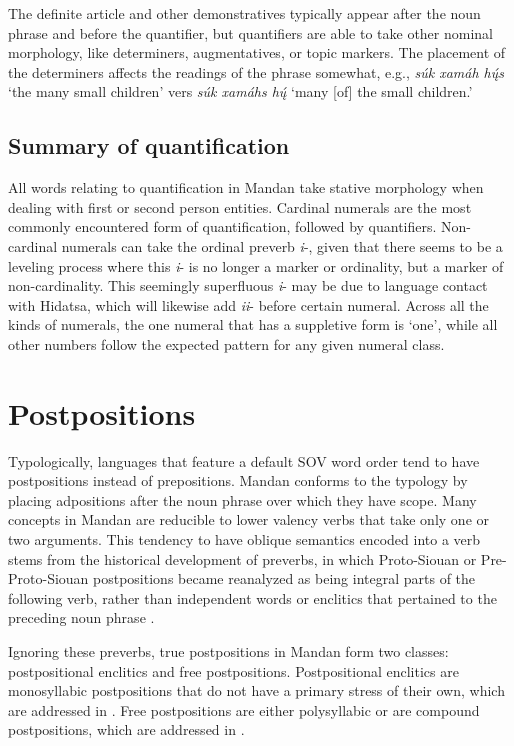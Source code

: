 The definite article and other demonstratives typically appear after the noun phrase and before the quantifier, but quantifiers are able to take other nominal morphology, like determiners, augmentatives, or topic markers. The placement of the determiners affects the readings of the phrase somewhat, e.g., \textit{súk xamáh hų́s} `the many small children' vers \textit{súk xamáhs hų́} `many [of] the small children.'

\subsection{Summary of quantification}\label{SubSubSubSecQuantificationSummary}

All words relating to quantification in Mandan take stative morphology when dealing with first or second person entities. Cardinal numerals are the most commonly encountered form of quantification, followed by quantifiers. Non-cardinal numerals can take the ordinal preverb \textit{i}-, given that there seems to be a leveling process where this \textit{i}- is no longer a marker or ordinality, but a marker of non-cardinality. This seemingly superfluous \textit{i}- may be due to language contact with Hidatsa, which will likewise add \textit{ii}- before certain numeral. Across all the kinds of numerals, the one numeral that has a suppletive form is `one', while all other numbers follow the expected pattern for any given numeral class.

\section{Postpositions}\label{SecPostpositions}

Typologically, languages that feature a default SOV word order tend to have postpositions instead of prepositions. Mandan conforms to the typology by placing adpositions after the noun phrase over which they have scope. Many concepts in Mandan are reducible to lower valency verbs that take only one or two arguments. This tendency to have oblique semantics encoded into a verb stems from the historical development of preverbs, in which Proto-Siouan or Pre-Proto-Siouan postpositions became reanalyzed as being integral parts of the following verb, rather than independent words or enclitics that pertained to the preceding noun phrase \citep{helmbrecht2006,helmbrecht2008,helmbrechtlehmann2008,kasak2019}.

Ignoring these preverbs, true postpositions in Mandan form two classes: postpositional enclitics and free postpositions. Postpositional enclitics are monosyllabic postpositions that do not have a primary stress of their own, which are addressed in . Free postpositions are either polysyllabic or are compound postpositions, which are addressed in .

